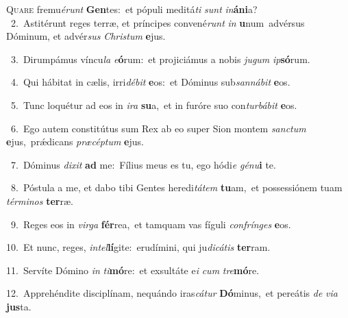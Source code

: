 \lettrine{\initial\textcolor{\initialcolor}{Q}}{uare} fremu\-\textit{é}\-\textit{runt} \textbf{Gen}\-tes:~\star et pópuli meditá\textit{ti} \textit{sunt} \textit{in}\-\textbf{á}\textbf{ni}a?\\
{\numbfont\textcolor{\numbcolor}{~2.}}~Astitérunt reges terræ, et príncipes convené\textit{runt} \textit{in} \textbf{u}\-num~\star advérsus Dóminum, et advér\textit{sus} \textit{Chris}\-\textit{tum} \textbf{e}\-jus.\par
{\numbfont\textcolor{\numbcolor}{~3.}}~Dirumpámus víncu\textit{la} \textit{e}\-\textbf{ó}rum:~\star et projiciámus a nobis \textit{ju}\-\textit{gum} \textit{ip}\-\textbf{só}rum.\par
{\numbfont\textcolor{\numbcolor}{~4.}}~Qui hábitat in cælis, irri\-\textit{dé}\-\textit{bit} \textbf{e}\-os:~\star et Dóminus sub\-\textit{san}\-\textit{ná}\textit{bit} \textbf{e}\-os.\par
{\numbfont\textcolor{\numbcolor}{~5.}}~Tunc loquétur ad eos in \textit{i}\-\textit{ra} \textbf{su}\-a,~\star et in furóre suo con\-\textit{tur}\-\textit{bá}\textit{bit} \textbf{e}\-os.\par
{\numbfont\textcolor{\numbcolor}{~6.}}~Ego autem constitútus sum Rex ab eo super Sion montem \textit{sanc}\-\textit{tum} \textbf{e}\-jus,~\star prǽdicans \textit{præ}\-\textit{cép}\textit{tum} \textbf{e}\-jus.\par
{\numbfont\textcolor{\numbcolor}{~7.}}~Dóminus \textit{di}\-\textit{xit} \textbf{ad} me:~\star Fílius meus es tu, ego hódi\textit{e} \textit{gé}\-\textit{nu}\textbf{i} te.\par
{\numbfont\textcolor{\numbcolor}{~8.}}~Póstula a me, et dabo tibi Gentes heredi\-\textit{tá}\-\textit{tem} \textbf{tu}\-am,~\star et possessiónem tuam \textit{tér}\-\textit{mi}\textit{nos} \textbf{ter}\-ræ.\par
{\numbfont\textcolor{\numbcolor}{~9.}}~Reges eos in \textit{vir}\-\textit{ga} \textbf{fér}\-rea,~\star et tamquam vas fíguli \textit{con}\-\textit{frín}\textit{ges} \textbf{e}\-os.\par
{\numbfont\textcolor{\numbcolor}{10.}}~Et nunc, reges, \textit{in}\-\textit{tel}\textbf{lí}gite:~\star erudímini, qui ju\-\textit{di}\-\textit{cá}\textit{tis} \textbf{ter}\-ram.\par
{\numbfont\textcolor{\numbcolor}{11.}}~Servíte Dómino \textit{in} \textit{ti}\-\textbf{mó}re:~\star et exsultáte e\textit{i} \textit{cum} \textit{tre}\-\textbf{mó}re.\par
{\numbfont\textcolor{\numbcolor}{12.}}~Apprehéndite disciplínam, nequándo iras\-\textit{cá}\-\textit{tur} \textbf{Dó}\-minus,~\star et pereátis \textit{de} \textit{vi}\-\textit{a} \textbf{jus}\-ta.\par
